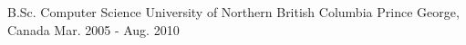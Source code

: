 

\begin{cventries}

  \cventry
    {B.Sc. Computer Science} %
    {University of Northern British Columbia} %
    {Prince George, Canada} %
    {Mar. 2005 - Aug. 2010} %
    {
      \begin{cvitems} %
      \end{cvitems}
    }

\end{cventries}
